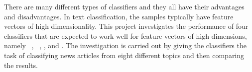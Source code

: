 There are many different types of classifiers and they all have their advantages and disadvantages. In text classification, the samples typically have feature vectors of high dimensionality. This project investigates the performance of four classifiers that are expected to work well for feature vectors of high dimensions, namely \bn\ \nb, \mn\ \nb, \rf, and \svm. The investigation is carried out by giving the classifiers the task of classifying news articles from eight different topics and then comparing the results.